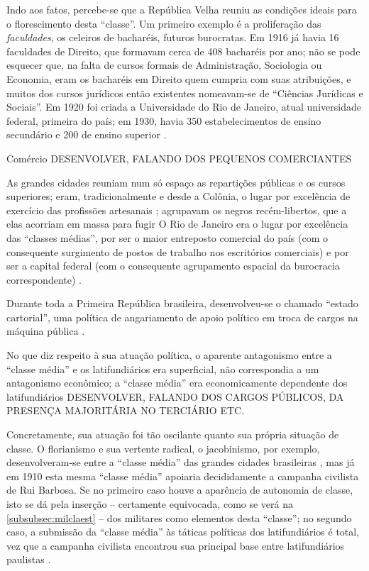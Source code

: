 Indo aos fatos, percebe-se que a República Velha reuniu as condições ideais para o florescimento desta ``classe''. Um primeiro exemplo é a proliferação das \textit{faculdades}, os celeiros de bacharéis, futuros burocratas. Em 1916 já havia 16 faculdades de Direito, que formavam cerca de 408 bacharéis por ano; não se pode esquecer que, na falta de cursos formais de Administração, Sociologia ou Economia, eram os bacharéis em Direito quem cumpria com suas atribuições, e muitos dos cursos jurídicos então existentes nomeavam-se de ``Ciências Jurídicas e Sociais''. Em 1920 foi criada a Universidade do Rio de Janeiro, atual universidade federal, primeira do país; em 1930, havia 350 estabelecimentos de ensino secundário e 200 de ensino superior \cite[p.~17]{pinheiro_clamed_1977}.

Comércio DESENVOLVER, FALANDO DOS PEQUENOS COMERCIANTES

As grandes cidades reuniam num só espaço as repartições públicas e os cursos superiores; eram, tradicionalmente e desde a Colônia, o lugar por excelência de exercício das profissões artesanais \cite{REIS2012}; agrupavam os negros recém-libertos, que a elas acorriam em massa para fugir  O Rio de Janeiro era o lugar por excelência das ``classes médias'', por ser o maior entreposto comercial do país (com o consequente surgimento de postos de trabalho nos escritórios comerciais) e por ser a capital federal (com o consequente agrupamento espacial da burocracia correspondente) \cite[p.~119]{pinheiro_clamed_1977}.

Durante toda a Primeira República brasileira, desenvolveu-se o chamado ``estado cartorial'', uma política de angariamento de apoio político em troca de cargos na máquina pública \cite[p.~20]{pinheiro_clamed_1977}.

No que diz respeito à sua atuação política, o aparente antagonismo entre a ``classe média'' e os latifundiários era superficial, não correspondia a um antagonismo econômico; a ``classe média'' era economicamente dependente dos latifundiários DESENVOLVER, FALANDO DOS CARGOS PÚBLICOS, DA PRESENÇA MAJORITÁRIA NO TERCIÁRIO ETC.

Concretamente, sua atuação foi tão oscilante quanto sua própria situação de classe. O florianismo e sua vertente radical, o jacobinismo, por exemplo, desenvolveram-se entre a ``classe média'' das grandes cidades brasileiras \cite{queiroz_radicais_1986}, mas já em 1910 esta mesma ``classe média'' apoiaria decididamente a campanha civilista de Rui Barbosa. Se no primeiro caso houve a aparência de autonomia de classe, isto se dá pela inserção -- certamente equivocada, como se verá na \autoref{subsubsec:milclaest} -- dos militares como elementos desta ``classe''; no segundo caso, a submissão da ``classe média'' às táticas políticas dos latifundiários é total, vez que a campanha civilista encontrou sua principal base entre latifundiários paulistas \cite[p.~28-29]{pinheiro_clamed_1977}.

